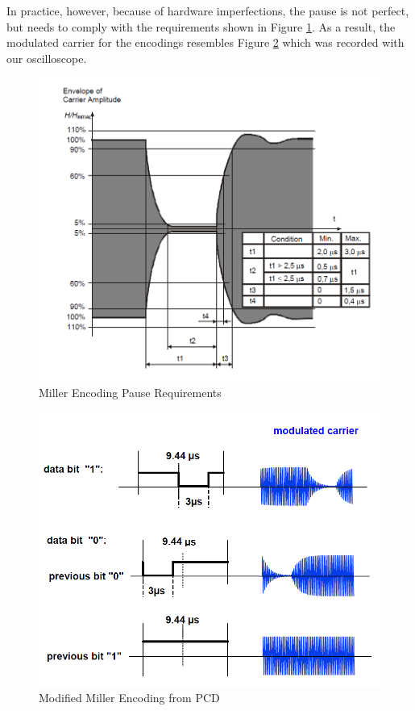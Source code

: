 \documentclass[fleqn,10pt]{SelfArx} %
\begin{document}
In practice, however, because of hardware imperfections, the pause is not perfect, but needs to comply with the requirements shown in Figure \ref{fig:pause}. As a result, the modulated carrier for the encodings resembles Figure \ref{fig:miller2} which was recorded with our oscilloscope.

\begin{figure}[tp]
  \includegraphics[width=\linewidth]{img/pause}
  \caption{Miller Encoding Pause Requirements \cite{iso144432}}
  \label{fig:pause}
\end{figure}


\begin{figure}[tp]
  \includegraphics[width=\linewidth]{img/miller2}
  \caption{Modified Miller Encoding from PCD}
  \label{fig:miller2}
\end{figure}
\end{document}
